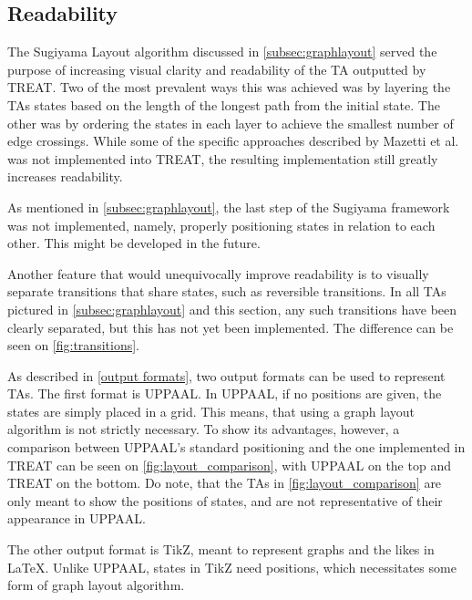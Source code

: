 \subsection{Readability}

The Sugiyama Layout algorithm discussed in \cref{subsec:graphlayout} served the purpose of increasing visual clarity and readability of the TA outputted by TREAT.
Two of the most prevalent ways this was achieved was by layering the TAs states based on the length of the longest path from the initial state. The other was by ordering the states in each layer to achieve the smallest number of edge crossings.
While some of the specific approaches described by Mazetti et al. \cite{Mazetti2012} was not implemented into TREAT, the resulting implementation still greatly increases readability.

As mentioned in \cref{subsec:graphlayout}, the last step of the Sugiyama framework was not implemented, namely, properly positioning states in relation to each other. This might be developed in the future.

Another feature that would unequivocally improve readability is to visually separate transitions that share states, such as reversible transitions. In all TAs pictured in \cref{subsec:graphlayout} and this section, any such transitions have been clearly separated, but this has not yet been implemented. The difference can be seen on \cref{fig:transitions}.

\begin{center}
    
\end{center}

As described in \cref{output formats}, two output formats can be used to represent TAs. The first format is UPPAAL. In UPPAAL, if no positions are given, the states are simply placed in a grid. This means, that using a graph layout algorithm is not strictly necessary. To show its advantages, however, a comparison between UPPAAL's standard positioning and the one implemented in TREAT can be seen on \cref{fig:layout_comparison}, with UPPAAL on the top and TREAT on the bottom.
Do note, that the TAs in \cref{fig:layout_comparison} are only meant to show the positions of states, and are not representative of their appearance in UPPAAL.

\begin{center}
    
    
\end{center}
\vspace{1em}

The other output format is TikZ, meant to represent graphs and the likes in LaTeX. Unlike UPPAAL, states in TikZ need positions, which necessitates some form of graph layout algorithm.


